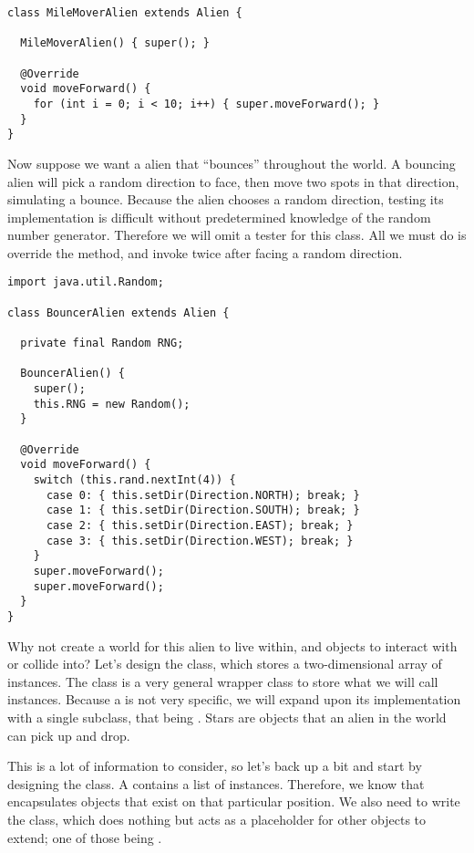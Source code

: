 \enlargethispage{4\baselineskip}
\begin{lstlisting}[language=MyJava]
class MileMoverAlien extends Alien {

  MileMoverAlien() { super(); }

  @Override
  void moveForward() {
    for (int i = 0; i < 10; i++) { super.moveForward(); }
  }
}
\end{lstlisting}

Now suppose we want a alien that ``bounces'' throughout the world. A bouncing alien will pick a random direction to face, then move two spots in that direction, simulating a bounce. Because the alien chooses a random direction, testing its implementation is difficult without predetermined knowledge of the random number generator. Therefore we will omit a tester for this class. All we must do is override the  method, and invoke  twice after facing a random direction.

\begin{lstlisting}[language=MyJava]
import java.util.Random;

class BouncerAlien extends Alien {

  private final Random RNG;

  BouncerAlien() {
    super();
    this.RNG = new Random();
  }

  @Override
  void moveForward() {
    switch (this.rand.nextInt(4)) {
      case 0: { this.setDir(Direction.NORTH); break; }
      case 1: { this.setDir(Direction.SOUTH); break; }
      case 2: { this.setDir(Direction.EAST); break; }
      case 3: { this.setDir(Direction.WEST); break; }
    }
    super.moveForward();
    super.moveForward();
  }
}
\end{lstlisting}

Why not create a world for this alien to live within, and objects to interact with or collide into? Let's design the  class, which stores a two-dimensional array of  instances. The  class is a very general wrapper class to store what we will call  instances. Because a  is not very specific, we will expand upon its implementation with a single subclass, that being . Stars are objects that an alien in the world can pick up and drop. 

This is a lot of information to consider, so let's back up a bit and start by designing the  class. A  contains a list of  instances. Therefore, we know that  encapsulates objects that exist on that particular position. We also need to write the  class, which does nothing but acts as a placeholder for other objects to extend; one of those being .

